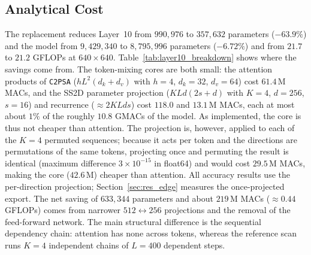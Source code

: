 \subsection{Analytical Cost}
\label{sec:complexity}
The replacement reduces Layer~10 from $990{,}976$ to $357{,}632$ parameters ($-63.9\%$) and the model from $9{,}429{,}340$ to $8{,}795{,}996$ parameters ($-6.72\%$) and from $21.7$ to $21.2$ GFLOPs at $640 \times 640$. Table~\ref{tab:layer10_breakdown} shows where the savings come from. The token-mixing cores are both small: the attention products of \texttt{C2PSA} ($h L^2 (d_k + d_v)$ with $h = 4$, $d_k = 32$, $d_v = 64$) cost $61.4$\,M MACs, and the SS2D parameter projection ($K L d (2s + d)$ with $K = 4$, $d = 256$, $s = 16$) and recurrence ($\approx 2 K L d s$) cost $118.0$ and $13.1$\,M MACs, each at most about $1\%$ of the roughly $10.8$ GMACs of the model. As implemented, the core is thus not cheaper than attention. The projection is, however, applied to each of the $K = 4$ permuted sequences; because it acts per token and the directions are permutations of the same tokens, projecting once and permuting the result is identical (maximum difference $3 \times 10^{-15}$ in float64) and would cost $29.5$\,M MACs, making the core ($42.6$\,M) cheaper than attention. All accuracy results use the per-direction projection; Section~\ref{sec:res_edge} measures the once-projected export. The net saving of $633{,}344$ parameters and about $219$\,M MACs ($\approx 0.44$ GFLOPs) comes from narrower $512 \leftrightarrow 256$ projections and the removal of the feed-forward network. The main structural difference is the sequential dependency chain: attention has none across tokens, whereas the reference scan runs $K = 4$ independent chains of $L = 400$ dependent steps.

